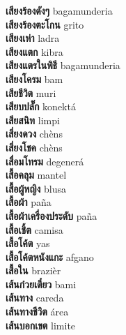 \textbf{ เสียงร้องดังๆ  } bagamunderia \\
\textbf{ เสียงร้องตะโกน  } grito \\
\textbf{ เสียงเห่า  } ladra \\
\textbf{ เสียงแตก  } kibra \\
\textbf{ เสียงแตรในพิธี  } bagamunderia \\
\textbf{ เสียงโครม  } bam \\
\textbf{ เสียชีวิต  } muri \\
\textbf{ เสียบปลั๊ก  } konektá \\
\textbf{ เสียสนิท  } limpi \\
\textbf{ เสี่ยงดวง  } chèns \\
\textbf{ เสี่ยงโชค  } chèns \\
\textbf{ เสื่อมโทรม  } degenerá \\
\textbf{ เสื้อคลุม  } mantel \\
\textbf{ เสื้อผู้หญิง  } blusa \\
\textbf{ เสื้อผ้า  } paña \\
\textbf{ เสื้อผ้าเครื่องประดับ  } paña \\
\textbf{ เสื้อเชิ้ต  } camisa \\
\textbf{ เสื้อโค้ต  } yas \\
\textbf{ เสื้อโค้ตหนังแกะ  } afgano \\
\textbf{ เสื้อใน  } brazièr \\
\textbf{ เส้นก๋วยเตี๋ยว  } bami \\
\textbf{ เส้นทาง  } careda \\
\textbf{ เส้นทางชีวิต  } área \\
\textbf{ เส้นบอกเขต  } limite \\
